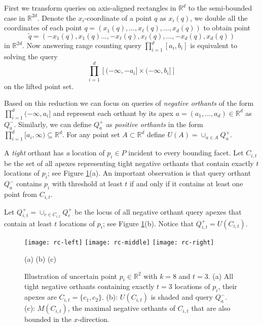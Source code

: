 \documentclass[11pt]{myclass}
\newcommand{\bl}[1]{\ensuremath{\mathbb{#1}}}
\begin{document}
First we transform queries on axis-aligned rectangles in $\bl{R}^d$ to the semi-bounded case in $\bl{R}^{2d}$.  Denote the $x_i$-coordinate of a point $q$ as $x_i(q)$, we double all the coordinates of each point $q = (x_1(q),...,x_{\ell}(q),..., x_d(q))$ to obtain point \[ \tilde{q} = (-x_1(q),x_1(q)...,-x_{\ell}(q),x_{\ell}(q),..., -x_d(q),x_d(q))\] in $\bl{R}^{2d}$. 
Now answering range counting query $\prod_{i=1}^d [a_i, b_i]$ is equivalent to solving the query  \[
\prod_{i=1}^d\left[(-\infty, -a_i] \times (-\infty, b_i] \right]
\]
on the lifted point set.

Based on this reduction we can focus on queries of \emph{negative orthants} of the form $\prod_{i=1}^d (-\infty, a_i]$ and represent each orthant by its apex $a =(a_1, ..., a_{d}) \in \bl{R}^{d}$ as $Q_a^-$.  Similarly, we can define $Q_a^+$ as \emph{positive orthants} in the form $\prod_{i=1}^d [a_i, \infty) \subseteq \bl{R}^d$. For any point set $A \subset \bl{R}^d$ define $U(A) = \cup_{a \in A} Q_a^+$.

A \emph{tight} orthant has \emph{a} location of $p_i \in P$ incident to every bounding facet.    
Let $C_{i,t}$ be the set of all apexes representing tight negative orthants that contain exactly $t$ locations of $p_i$; see Figure \ref{fig:rc123}(a).   An important observation is that query orthant $Q_a^-$ contains $p_i$ with threshold at least $t$ if and only if it contains at least one point from $C_{i,t}$.
 
Let $Q^+_{i,t} = \cup_{c \in C_{i,t} }Q_c^+$ be the locus of all negative orthant query apexes that contain at least $t$ locations of $p_i$; see Figure \ref{fig:rc123}(b).  
Notice that $Q^+_{i,t} = U(C_{i,t})$.
 
\begin{figure}[t]
\centering
\texttt{[image: rc-left]}
\hspace{2mm}
\texttt{[image: rc-middle]}
\hspace{2mm}
\texttt{[image: rc-right]}

\vspace{-1mm}
(a)  \hspace{1.85in} (b) \hspace{1.85in} (c)

\vspace{-3mm}
\caption{\small Illustration of uncertain point $p_i \in \bl{R}^2$ with $k = 8$ and $t = 3$. 
(a) All tight negative orthants containing exactly $t=3$ locations of $p_i$, their apexes are $C_{i,t} = \{c_1, c_2\}$. 
(b): $U(C_{i,t})$ is shaded and query $Q_a^-$.
(c): $M(C_{i,t})$, the maximal negative orthants of $C_{i,t}$ that are also bounded in the $x$-direction.  
\vspace{-4mm}}

\label{fig:rc123}
\end{figure}
\end{document}
